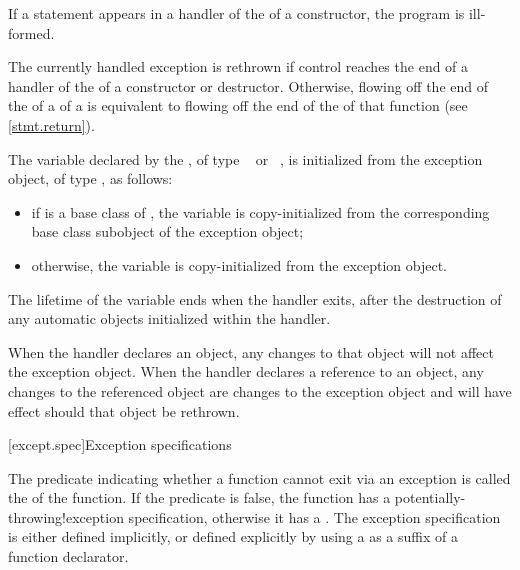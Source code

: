 \pnum
If a  statement appears in a handler of the
of a
constructor, the program is ill-formed.

\pnum
The currently handled exception
is rethrown if control reaches the end of a handler of the
of a constructor or destructor.
Otherwise, flowing off the end of
the 
of a 
of a 
is equivalent to flowing off the end of
the 
of that function (see \ref{stmt.return}).

\pnum
The variable declared by the , of type
\cv{}~ or \cv{}~, is initialized from the exception object,
of type , as follows:

\begin{itemize}
\item
if  is a base class of , the variable is
copy-initialized from the corresponding base class subobject
of the exception object;
\item otherwise, the variable is copy-initialized
from the exception object.
\end{itemize}

The lifetime of the variable ends
when the handler exits, after the
destruction of any automatic objects initialized
within the handler.

\pnum
When the handler declares an object,
any changes to that object will not affect the exception object.
When the handler declares a reference to an object,
any changes to the referenced object are changes to the
exception object and will have effect should that object be rethrown.%
%

[except.spec]{Exception specifications}%

\pnum
The predicate indicating whether a function cannot exit via an exception
is called the  of the function.
If the predicate is false,
the function has a
%
%
{potentially-throwing!exception specification},
otherwise it has a
%
.
The exception specification is either defined implicitly,
or defined explicitly
by using a 
as a suffix of a function declarator.

